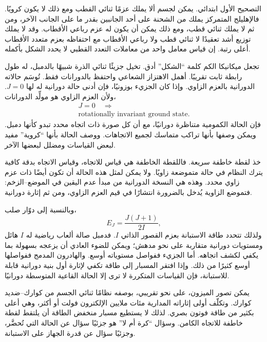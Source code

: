 التصحيح الأول ابتدائي. يمكن لجسم ألا يملك عزمًا ثنائي القطب ومع ذلك لا يكون كرويًا. فالإهليلج المتمركز يملك من الشحنة على أحد الجانبين بقدر ما على الجانب الآخر، ومن ثم لا يملك ثنائي قطب، ومع ذلك يمكن أن يكون له عزم رباعي الأقطاب. وقد لا يملك توزيع أشد تعقيدًا لا ثنائي قطب ولا رباعي الأقطاب مع احتفاظه بعزم متعدد الأقطاب أعلى رتبة. إن قياس معامل واحد من معاملات التعدد القطبي لا يحدد الشكل بأكمله.

تجعل ميكانيكا الكم كلمة ``الشكل'' أدق. تخيل جزيئًا ثنائي الذرة شبيهًا بالدمبل، له طول رابطة ثابت تقريبًا. أهمل الاهتزاز الشعاعي واحتفظ بالدورانات فقط. تُوسَم حالاته الدورانية بالعزم الزاوي. وإذا كان الجزيء بوزونيًا، فإن أدنى حالة دورانية له لها \(J=0\). ولأن العزم الزاوي هو مولِّد الدورانات، \begin{equation}
\begin{gathered}
J=0 \quad\Longrightarrow\\
\text{rotationally invariant ground state.}
\end{gathered}
\end{equation} فإن الحالة الكمومية متناظرة دورانيًا، مع أن كل صورة ذات اتجاه محدد تبدو كأنها دمبل. ويمكن وصفها بأنها تراكب متماسك لجميع الاتجاهات. ووصف الحالة بأنها ``كروية'' مفيد لبعض القياسات ومضلل لبعضها الآخر.

خذ لقطة خاطفة سريعة. فاللقطة الخاطفة هي قياس للاتجاه، وقياس الاتجاه بدقة كافية يترك النظام في حالة متموضعة زاويًا. ولا يمكن لمثل هذه الحالة أن تكون أيضًا ذات عزم زاوي محدد. وهذه هي النسخة الدورانية من مبدأ عدم اليقين في الموضع--الزخم: فتموضع الزاوية يُدخل بالضرورة انتشارًا في قيم العزم الزاوي، ومن ثم إثارة دورانية.

وبالنسبة إلى دوّار صلب، \begin{equation}
E_J=\frac{J(J+1)}{2I},
\end{equation} ولذلك تتحدد طاقة الاستبانة بعزم القصور الذاتي \(I\). فدمبل صالة ألعاب رياضية له \(I\) هائل ومستويات دورانية متقاربة على نحو مدهش؛ ويمكن للضوء العادي أن يزعجه بسهولة بما يكفي لكشف اتجاهه. أما الجزيء ففواصل مستوياته أوسع. والهادرون المدمج ففواصلها أوسع كثيرًا من ذلك. وإذا افتقر المسبار إلى طاقة تكفي لإثارة أول بنية دورانية قابلة للاستبانة، فإن القياسات المتكررة لا ترى إلا الحالة القاعية المتوسطة دورانيًا.

يمكن تصور الميزون، على نحو تقريبي، بوصفه نظامًا ثنائي الجسم من كوارك--ضديد كوارك. وتكلّف أولى إثاراته المدارية مئات ملايين الإلكترون فولت أو أكثر، وهي أعلى بكثير من طاقة فوتون بصري. لذلك لا يستطيع مسبار منخفض الطاقة أن يلتقط لقطة خاطفة للاتجاه الكامن. وسؤال ``كرة أم لا'' هو جزئيًا سؤال عن الحالة التي تُحضَّر، وجزئيًا سؤال عن قدرة الجهاز على الاستبانة.

